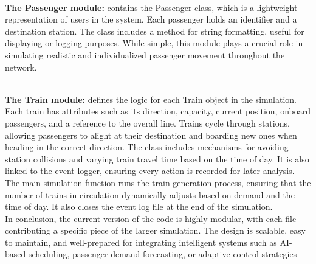~\\[0,5cm]
\noindent\textbf{The Passenger module:} contains the Passenger class, which is a lightweight representation of users in the system. Each passenger holds an identifier and a destination station. The class includes a method for string formatting, useful for displaying or logging purposes. While simple, this module plays a crucial role in simulating realistic and individualized passenger movement throughout the network.


~\\[0,5cm]
\noindent\textbf{The Train module:} defines the logic for each Train object in the simulation. Each train has attributes such as its direction, capacity, current position, onboard passengers, and a reference to the overall line. Trains cycle through stations, allowing passengers to alight at their destination and boarding new ones when heading in the correct direction. The class includes mechanisms for avoiding station collisions and varying train travel time based on the time of day. It is also linked to the event logger, ensuring every action is recorded for later analysis.
~\\[1cm]
The main simulation function runs the train generation process, ensuring that the number of trains in circulation dynamically adjusts based on demand and the time of day. It also closes the event log file at the end of the simulation.
~\\[0,5cm]

In conclusion, the current version of the code is highly modular, with each file contributing a specific piece of the larger simulation. The design is scalable, easy to maintain, and well-prepared for integrating intelligent systems such as AI-based scheduling, passenger demand forecasting, or adaptive control strategies




